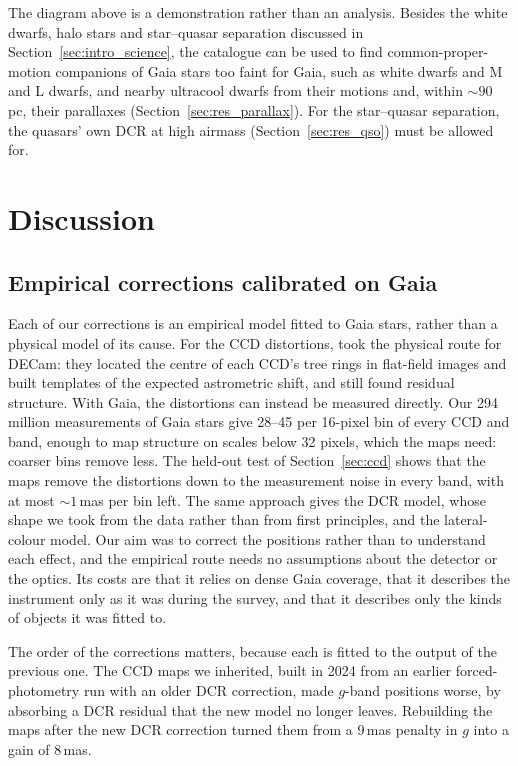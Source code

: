 \documentclass[usenatbib]{mnras}   %
\begin{document}
The diagram above is a demonstration rather than an analysis. Besides the white dwarfs, halo stars and star--quasar separation discussed in Section~\ref{sec:intro_science}, the catalogue can be used to find common-proper-motion companions of Gaia stars too faint for Gaia, such as white dwarfs and M and L dwarfs, and nearby ultracool dwarfs from their motions and, within $\sim\!90$\,pc, their parallaxes (Section~\ref{sec:res_parallax}). For the star--quasar separation, the quasars' own DCR at high airmass (Section~\ref{sec:res_qso}) must be allowed for.


\section{Discussion} \label{sec:discussion}

\subsection{Empirical corrections calibrated on Gaia}

Each of our corrections is an empirical model fitted to Gaia stars, rather than a physical model of its cause. For the CCD distortions, \citet{Bernstein_2017} took the physical route for DECam: they located the centre of each CCD's tree rings in flat-field images and built templates of the expected astrometric shift, and still found residual structure. With Gaia, the distortions can instead be measured directly. Our 294 million measurements of Gaia stars give 28--45 per 16-pixel bin of every CCD and band, enough to map structure on scales below 32 pixels, which the maps need: coarser bins remove less. The held-out test of Section~\ref{sec:ccd} shows that the maps remove the distortions down to the measurement noise in every band, with at most $\sim\!1$\,mas per bin left. The same approach gives the DCR model, whose shape we took from the data rather than from first principles, and the lateral-colour model. Our aim was to correct the positions rather than to understand each effect, and the empirical route needs no assumptions about the detector or the optics. Its costs are that it relies on dense Gaia coverage, that it describes the instrument only as it was during the survey, and that it describes only the kinds of objects it was fitted to.

The order of the corrections matters, because each is fitted to the output of the previous one. The CCD maps we inherited, built in 2024 from an earlier forced-photometry run with an older DCR correction, made $g$-band positions worse, by absorbing a DCR residual that the new model no longer leaves. Rebuilding the maps after the new DCR correction turned them from a 9\,mas penalty in $g$ into a gain of 8\,mas.
\end{document}
